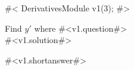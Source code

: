 

#<
DerivativesModule v1(3);
#>


Find $y'$ where #<v1.question#> \\



#<v1.solution#>



#<v1.shortanswer#>



